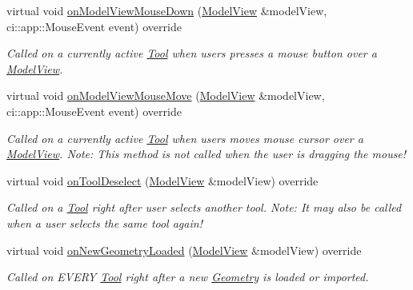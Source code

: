 \begin{DoxyCompactItemize}
virtual void \mbox{\hyperlink{classpepr3d_1_1_segmentation_a7c9ae1b970f2b19f7c8cc6d7009b106d}{on\+Model\+View\+Mouse\+Down}} (\mbox{\hyperlink{classpepr3d_1_1_model_view}{Model\+View}} \&model\+View, ci\+::app\+::\+Mouse\+Event event) override
\begin{DoxyCompactList}\small\item\em Called on a currently active \mbox{\hyperlink{classpepr3d_1_1_tool}{Tool}} when users presses a mouse button over a \mbox{\hyperlink{classpepr3d_1_1_model_view}{Model\+View}}. \end{DoxyCompactList}\item 
\mbox{\label{classpepr3d_1_1_segmentation_a42edd9ea2cb784c82804d3e84dcde864}} 
virtual void \mbox{\hyperlink{classpepr3d_1_1_segmentation_a42edd9ea2cb784c82804d3e84dcde864}{on\+Model\+View\+Mouse\+Move}} (\mbox{\hyperlink{classpepr3d_1_1_model_view}{Model\+View}} \&model\+View, ci\+::app\+::\+Mouse\+Event event) override
\begin{DoxyCompactList}\small\item\em Called on a currently active \mbox{\hyperlink{classpepr3d_1_1_tool}{Tool}} when users moves mouse cursor over a \mbox{\hyperlink{classpepr3d_1_1_model_view}{Model\+View}}. Note\+: This method is not called when the user is dragging the mouse! \end{DoxyCompactList}\item 
\mbox{\label{classpepr3d_1_1_segmentation_abe22494520721c3d078daca8abbfd4ae}} 
virtual void \mbox{\hyperlink{classpepr3d_1_1_segmentation_abe22494520721c3d078daca8abbfd4ae}{on\+Tool\+Deselect}} (\mbox{\hyperlink{classpepr3d_1_1_model_view}{Model\+View}} \&model\+View) override
\begin{DoxyCompactList}\small\item\em Called on a \mbox{\hyperlink{classpepr3d_1_1_tool}{Tool}} right after user selects another tool. Note\+: It may also be called when a user selects the same tool again! \end{DoxyCompactList}\item 
\mbox{\label{classpepr3d_1_1_segmentation_ac8b133f64246862034299f64b38cd080}} 
virtual void \mbox{\hyperlink{classpepr3d_1_1_segmentation_ac8b133f64246862034299f64b38cd080}{on\+New\+Geometry\+Loaded}} (\mbox{\hyperlink{classpepr3d_1_1_model_view}{Model\+View}} \&model\+View) override
\begin{DoxyCompactList}\small\item\em Called on E\+V\+E\+RY \mbox{\hyperlink{classpepr3d_1_1_tool}{Tool}} right after a new \mbox{\hyperlink{classpepr3d_1_1_geometry}{Geometry}} is loaded or imported. \end{DoxyCompactList}\end{DoxyCompactItemize}
